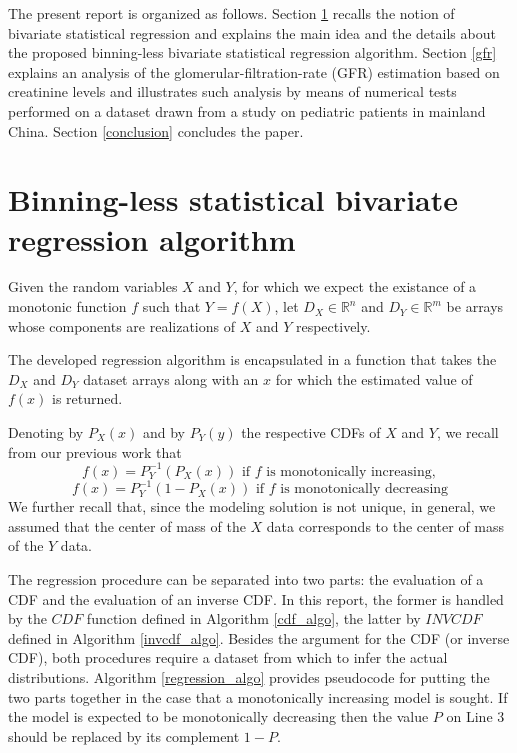 \documentclass[10pt,final]{siamltex}
\begin{document}
The present report is organized as follows. Section \ref{blsbr} recalls the notion of bivariate statistical regression and explains the main idea and the details about the proposed binning-less bivariate statistical regression algorithm. Section \ref{gfr} explains an analysis of the glomerular-filtration-rate (GFR) estimation based on creatinine levels and illustrates such analysis by means of numerical tests performed on a dataset drawn from a study on pediatric patients in mainland China. Section \ref{conclusion} concludes the paper.
%
\section{Binning-less statistical bivariate regression algorithm}\label{blsbr}
%
Given the random variables $X$ and $Y$, for which we expect the existance of a monotonic function $f$ such that $Y=f(X)$, let $D_X \in \mathbb{R}^n$ and $D_Y \in \mathbb{R}^m$ be arrays whose components are realizations of $X$ and $Y$ respectively.

The developed regression algorithm is encapsulated in a function that takes the $D_X$ and $D_Y$ dataset arrays along with an $x$ for which the estimated value of $f(x)$ is returned.

Denoting by $P_X(x)$ and by $P_Y(y)$ the respective CDFs of $X$ and $Y$, we recall from our previous work \cite{fiori,fgl} that
\begin{equation}
  f(x)=P_Y^{-1}(P_X(x)) \text{ if $f$ is monotonically increasing},
\end{equation}
\begin{equation}
  f(x)=P_Y^{-1}(1-P_X(x)) \text{ if $f$ is monotonically decreasing}
\end{equation}
We further recall that, since the modeling solution is not unique, in general, we assumed that the center of mass of the $X$ data corresponds to the center of mass of the $Y$ data.

The regression procedure can be separated into two parts: the evaluation of a CDF and the evaluation of an inverse CDF. In this report, the former is handled by the $CDF$ function defined in Algorithm \ref{cdf_algo}, the latter by $INVCDF$ defined in Algorithm \ref{invcdf_algo}. Besides the argument for the CDF (or inverse CDF), both procedures require a dataset from which to infer the actual distributions. Algorithm \ref{regression_algo} provides pseudocode for putting the two parts together in the case that a monotonically increasing model is sought. If the model is expected to be monotonically decreasing then the value $P$ on Line 3 should be replaced by its complement $1-P$.
\end{document}
